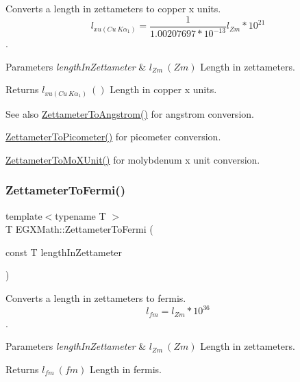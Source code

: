 Converts a length in zettameters to copper x units. \[ l_{xu(Cu\ K\alpha_1)}= \frac{1}{1.00207697*10^{-13}} l_{Zm} * 10^{21}\]. 


\begin{DoxyParams}{Parameters}
{\em length\+In\+Zettameter} & $ l_{Zm}\ (Zm)$ Length in zettameters. \\
\hline
\end{DoxyParams}
\begin{DoxyReturn}{Returns}
$ l_{xu(Cu\ K\alpha_1)}\ ()$ Length in copper x units. 
\end{DoxyReturn}
\begin{DoxySeeAlso}{See also}
\mbox{\hyperlink{group___e_g_x_math-_conversions-_length_conversions-_zettameter-_non-_s_i_ga49d813ff9592fc1fc9a184436d0849fc}{Zettameter\+To\+Angstrom()}} for angstrom conversion. 

\mbox{\hyperlink{group___e_g_x_math-_conversions-_length_conversions-_zettameter-_s_i_gae7835234c6727bbfd1e9ad40c54a4740}{Zettameter\+To\+Picometer()}} for picometer conversion. 

\mbox{\hyperlink{group___e_g_x_math-_conversions-_length_conversions-_zettameter-_non-_s_i_ga10039261b7de3417e69110a56312b9ef}{Zettameter\+To\+Mo\+X\+Unit()}} for molybdenum x unit conversion. 
\end{DoxySeeAlso}
\mbox{\label{group___e_g_x_math-_conversions-_length_conversions-_zettameter-_non-_s_i_ga791b0a401fe813fe4e6a34490f12a817}} 
\subsubsection{\texorpdfstring{Zettameter\+To\+Fermi()}{ZettameterToFermi()}}
{\footnotesize\ttfamily template$<$typename T $>$ \\
T E\+G\+X\+Math\+::\+Zettameter\+To\+Fermi (\begin{DoxyParamCaption}\item[{const T}]{length\+In\+Zettameter }\end{DoxyParamCaption})}



Converts a length in zettameters to fermis. \[ l_{fm}=l_{Zm} * 10^{36} \]. 


\begin{DoxyParams}{Parameters}
{\em length\+In\+Zettameter} & $ l_{Zm}\ (Zm)$ Length in zettameters. \\
\hline
\end{DoxyParams}
\begin{DoxyReturn}{Returns}
$ l_{fm}\ (fm)$ Length in fermis. 
\end{DoxyReturn}
\mbox{\label{group___e_g_x_math-_conversions-_length_conversions-_zettameter-_non-_s_i_gafede369c63111d97f92238e626cdfa87}} 
